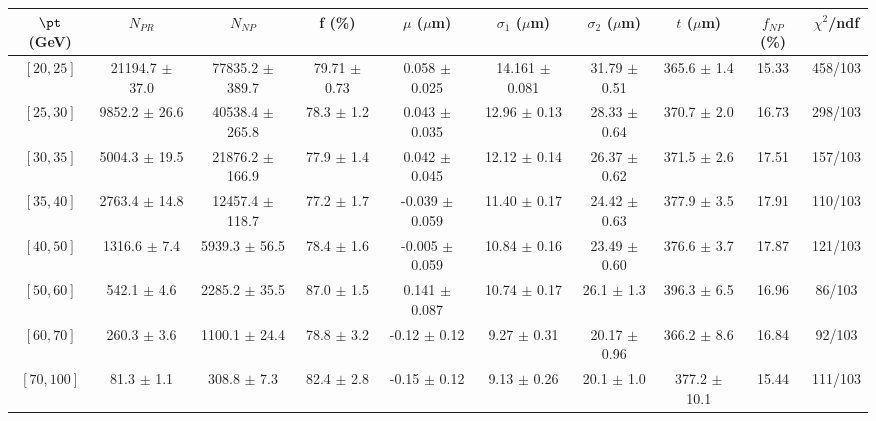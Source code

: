 \begin{tabular}{c||c|c|c|c|c|c|c||c|c}
$\pt$ (GeV) & $N_{PR}$ & $N_{NP}$ & f (\%) & $\mu$ ($\mu$m) & $\sigma_1$ ($\mu$m) & $\sigma_2$ ($\mu$m)  & $t$ ($\mu$m) & $f_{NP}$ (\%) & $\chi^2$/ndf \\
\hline
$[20, 25]$ & 21194.7 $\pm$ 37.0 & 77835.2 $\pm$ 389.7 & 79.71 $\pm$ 0.73 & 0.058 $\pm$ 0.025 & 14.161 $\pm$ 0.081 & 31.79 $\pm$ 0.51 & 365.6 $\pm$ 1.4 & 15.33 & 458/103\\
$[25, 30]$ & 9852.2 $\pm$ 26.6 & 40538.4 $\pm$ 265.8 & 78.3 $\pm$ 1.2 & 0.043 $\pm$ 0.035 & 12.96 $\pm$ 0.13 & 28.33 $\pm$ 0.64 & 370.7 $\pm$ 2.0 & 16.73 & 298/103\\
$[30, 35]$ & 5004.3 $\pm$ 19.5 & 21876.2 $\pm$ 166.9 & 77.9 $\pm$ 1.4 & 0.042 $\pm$ 0.045 & 12.12 $\pm$ 0.14 & 26.37 $\pm$ 0.62 & 371.5 $\pm$ 2.6 & 17.51 & 157/103\\
$[35, 40]$ & 2763.4 $\pm$ 14.8 & 12457.4 $\pm$ 118.7 & 77.2 $\pm$ 1.7 & -0.039 $\pm$ 0.059 & 11.40 $\pm$ 0.17 & 24.42 $\pm$ 0.63 & 377.9 $\pm$ 3.5 & 17.91 & 110/103\\
$[40, 50]$ & 1316.6 $\pm$ 7.4 & 5939.3 $\pm$ 56.5 & 78.4 $\pm$ 1.6 & -0.005 $\pm$ 0.059 & 10.84 $\pm$ 0.16 & 23.49 $\pm$ 0.60 & 376.6 $\pm$ 3.7 & 17.87 & 121/103\\
$[50, 60]$ & 542.1 $\pm$ 4.6 & 2285.2 $\pm$ 35.5 & 87.0 $\pm$ 1.5 & 0.141 $\pm$ 0.087 & 10.74 $\pm$ 0.17 & 26.1 $\pm$ 1.3 & 396.3 $\pm$ 6.5 & 16.96 & 86/103\\
$[60, 70]$ & 260.3 $\pm$ 3.6 & 1100.1 $\pm$ 24.4 & 78.8 $\pm$ 3.2 & -0.12 $\pm$ 0.12 & 9.27 $\pm$ 0.31 & 20.17 $\pm$ 0.96 & 366.2 $\pm$ 8.6 & 16.84 & 92/103\\
$[70, 100]$ & 81.3 $\pm$ 1.1 & 308.8 $\pm$ 7.3 & 82.4 $\pm$ 2.8 & -0.15 $\pm$ 0.12 & 9.13 $\pm$ 0.26 & 20.1 $\pm$ 1.0 & 377.2 $\pm$ 10.1 & 15.44 & 111/103\\
\end{tabular}
